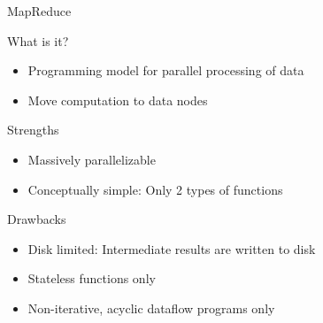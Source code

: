 \documentclass[ignorenonframetext,xcolor=x11names]{beamer}
\begin{document}
\begin{frame}{MapReduce}
\begin{block}{What is it?}
\begin{itemize}
\item Programming model for parallel processing of data
\item Move computation to data nodes
\end{itemize}
\end{block}

\begin{block}{Strengths}
\begin{itemize}
\item Massively parallelizable
\item Conceptually simple: Only 2 types of functions
\end{itemize}
\end{block}

\begin{block}{Drawbacks}
\begin{itemize}
\item Disk limited: Intermediate results are written to disk
\item Stateless functions only
\item Non-iterative, acyclic dataflow programs only
\end{itemize}
\end{block}
\end{frame}
\end{document}
